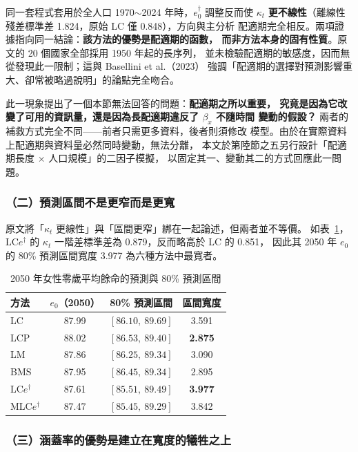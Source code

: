 \documentclass[UTF8, fontset=macnew, a4paper, 12pt]{ctexart}
\newcommand{\edag}{e_0^{\dagger}}
\newcommand{\LCe}{\mathrm{LC}e^{\dagger}}
\begin{document}
同一套程式套用於全人口 1970$\sim$2024 年時，$\edag$ 調整反而使 $\kappa_t$
\textbf{更不線性}（離線性殘差標準差 1.824，原始 LC 僅 0.848），方向與主分析
配適期完全相反。兩項證據指向同一結論：\textbf{該方法的優勢是配適期的函數，
而非方法本身的固有性質}。原文的 20 個國家全部採用 1950 年起的長序列，
並未檢驗配適期的敏感度，因而無從發現此一限制；這與 Basellini et al.（2023）
強調「配適期的選擇對預測影響重大、卻常被略過說明」的論點完全吻合。

此一現象提出了一個本節無法回答的問題：\textbf{配適期之所以重要，
究竟是因為它改變了可用的資訊量，還是因為長配適期違反了 $\beta_x$ 不隨時間
變動的假設？} 兩者的補救方式完全不同——前者只需更多資料，後者則須修改
模型。由於在實際資料上配適期與資料量必然同時變動，無法分離，
本文於第陸節之五另行設計「配適期長度 $\times$ 人口規模」的二因子模擬，
以固定其一、變動其二的方式回應此一問題。

\subsubsection{（二）預測區間不是更窄而是更寬}

原文將「$\kappa_t$ 更線性」與「區間更窄」綁在一起論述，但兩者並不等價。
如表~\ref{tab:e0}，$\LCe$ 的 $\kappa_t$ 一階差標準差為 0.879，反而略高於 LC 的 0.851，
因此其 2050 年 $e_0$ 的 80\% 預測區間寬度 3.977 為六種方法中最寬者。

\begin{table}[H]
\centering
\caption{2050 年女性零歲平均餘命的預測與 80\% 預測區間}
\small
\begin{tabular}{lccc}
\toprule
方法 & $e_0$（2050） & 80\% 預測區間 & 區間寬度\\
\midrule
LC      & 87.99 & $[86.10,\ 89.69]$ & 3.591\\
LCP     & 88.02 & $[86.53,\ 89.40]$ & \textbf{2.875}\\
LM      & 87.86 & $[86.25,\ 89.34]$ & 3.090\\
BMS     & 87.95 & $[86.45,\ 89.34]$ & 2.895\\
$\LCe$  & 87.61 & $[85.51,\ 89.49]$ & \textbf{3.977}\\
M$\LCe$ & 87.47 & $[85.45,\ 89.29]$ & 3.842\\
\bottomrule
\end{tabular}
\label{tab:e0}
\end{table}

\subsubsection{（三）涵蓋率的優勢是建立在寬度的犧牲之上}
\end{document}
